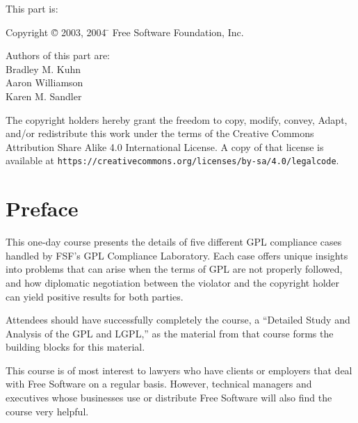 {\parindent 0in
{\parindent 0in
This part is: \\
\begin{tabbing}
Copyright \= \copyright{} 2003, 2004 \= \hspace{.2in} Free Software Foundation, Inc. \\
\end{tabbing}

\vspace{1in}

Authors of this part are: \\

Bradley M. Kuhn \\
Aaron Williamson \\
Karen M. Sandler \\

\vspace{3in}

The copyright holders hereby grant the freedom to copy, modify, convey,
Adapt, and/or redistribute this work under the terms of the Creative Commons
Attribution Share Alike 4.0 International License.  A copy of that license is
available at \verb=https://creativecommons.org/licenses/by-sa/4.0/legalcode=.
}


\chapter*{Preface}

This one-day course presents the details of five different GPL
compliance cases handled by FSF's GPL Compliance Laboratory. Each case
offers unique insights into problems that can arise when the terms of
GPL are not properly followed, and how diplomatic negotiation between
the violator and the copyright holder can yield positive results for
both parties.

Attendees should have successfully completely the course, a ``Detailed
Study and Analysis of the GPL and LGPL,'' as the material from that
course forms the building blocks for this material.

This course is of most interest to lawyers who have clients or
employers that deal with Free Software on a regular basis. However,
technical managers and executives whose businesses use or distribute
Free Software will also find the course very helpful.

}
